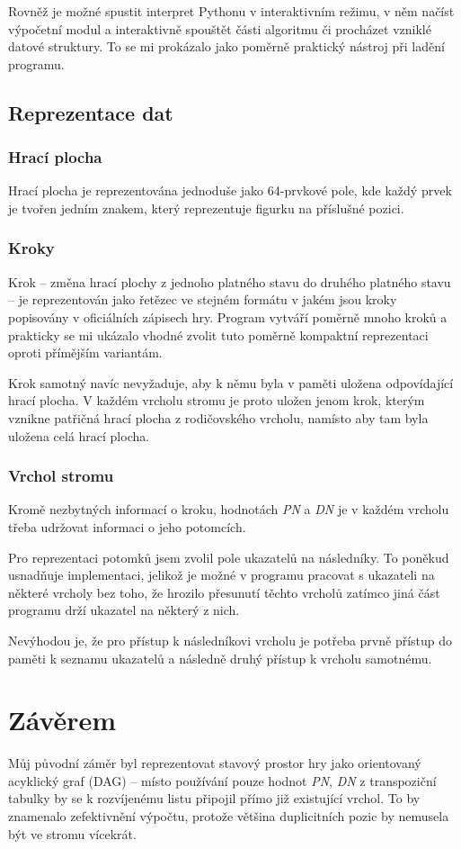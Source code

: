 \documentclass{article}
\begin{document}
Rovněž je možné spustit interpret Pythonu v interaktivním režimu, v něm načíst
výpočetní modul a interaktivně spouštět části algoritmu či procházet vzniklé 
datové struktury. To se mi prokázalo jako poměrně praktický nástroj při ladění
programu.

\subsection{Reprezentace dat}
\subsubsection{Hrací plocha}
Hrací plocha je reprezentována jednoduše jako 64-prvkové pole, kde každý prvek
je tvořen jedním znakem, který reprezentuje figurku na příslušné pozici.

\subsubsection{Kroky}
Krok -- změna hrací plochy z jednoho platného stavu do druhého platného stavu --
je reprezentován jako řetězec ve stejném formátu v jakém jsou kroky popisovány v 
oficiálních zápisech hry. Program vytváří poměrně mnoho kroků a prakticky se mi 
ukázalo vhodné zvolit tuto poměrně kompaktní reprezentaci oproti přímějším 
variantám.

Krok samotný navíc nevyžaduje, aby k němu byla v paměti uložena odpovídající
hrací plocha. V každém vrcholu stromu je proto uložen jenom krok, kterým vznikne 
patřičná hrací plocha z rodičovského vrcholu, namísto aby tam byla uložena celá
hrací plocha.

\subsubsection{Vrchol stromu}
Kromě nezbytných informací o kroku, hodnotách \emph{PN} a \emph{DN} je v každém
vrcholu třeba udržovat informaci o jeho potomcích.

Pro reprezentaci potomků jsem zvolil pole ukazatelů na následníky. To poněkud
usnadňuje implementaci, jelikož je možné v programu pracovat s ukazateli na
některé vrcholy bez toho, že hrozilo přesunutí těchto vrcholů zatímco jiná část
programu drží ukazatel na některý z nich.

Nevýhodou je, že pro přístup k následníkovi vrcholu je potřeba prvně přístup do
paměti k seznamu ukazatelů a následně druhý přístup k vrcholu samotnému. 

\section{Závěrem}
Můj původní záměr byl reprezentovat stavový prostor hry jako orientovaný
acyklický graf (DAG) -- místo používání pouze hodnot \emph{PN}, \emph{DN} z 
transpoziční tabulky by se k rozvíjenému listu připojil přímo již existující 
vrchol. To by znamenalo zefektivnění výpočtu, protože většina duplicitních pozic 
by nemusela být ve stromu vícekrát.
\end{document}
